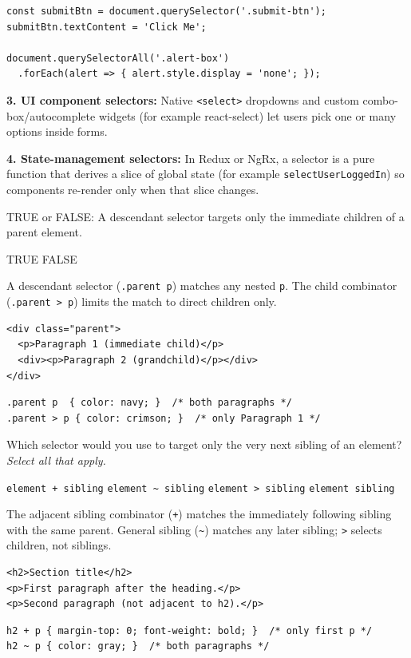 \begin{solutionorbox}[5in]
\begin{lstlisting}[style=js]
const submitBtn = document.querySelector('.submit-btn');
submitBtn.textContent = 'Click Me';

document.querySelectorAll('.alert-box')
  .forEach(alert => { alert.style.display = 'none'; });
\end{lstlisting}

\textbf{3. UI component selectors:} Native \lstinline[style=htmlinline]|<select>| dropdowns and custom combo-box/autocomplete widgets (for example react-select) let users pick one or many options inside forms.

\textbf{4. State-management selectors:} In Redux or NgRx, a selector is a pure function that derives a slice of global state (for example \lstinline[style=jsinline]|selectUserLoggedIn|) so components re-render only when that slice changes.
\end{solutionorbox}

\question[4]
TRUE or FALSE: A descendant selector targets only the immediate children of a parent element.
\begin{choices}
  \choice TRUE
  \CorrectChoice FALSE
\end{choices}
\begin{solution}
  A descendant selector (\texttt{.parent p}) matches any nested \texttt{p}. The child combinator (\texttt{.parent > p}) limits the match to direct children only.
\begin{lstlisting}[style=htmlinline]
<div class="parent">
  <p>Paragraph 1 (immediate child)</p>
  <div><p>Paragraph 2 (grandchild)</p></div>
</div>
\end{lstlisting}
\begin{lstlisting}[style=css]
.parent p  { color: navy; }  /* both paragraphs */
.parent > p { color: crimson; }  /* only Paragraph 1 */
\end{lstlisting}
\end{solution}

\question[4]
Which selector would you use to target only the very next sibling of an element? \emph{Select all that apply.}
\begin{checkboxes}
  \CorrectChoice \texttt{element + sibling}
  \choice \texttt{element \textasciitilde{} sibling}
  \choice \texttt{element > sibling}
  \choice \texttt{element sibling}
\end{checkboxes}
\begin{solution}
  The adjacent sibling combinator (\texttt{+}) matches the immediately following sibling with the same parent. General sibling (\texttt{{\textasciitilde}}) matches any later sibling; \texttt{>} selects children, not siblings.
\begin{lstlisting}[style=htmlinline]
<h2>Section title</h2>
<p>First paragraph after the heading.</p>
<p>Second paragraph (not adjacent to h2).</p>
\end{lstlisting}
\begin{lstlisting}[style=css]
h2 + p { margin-top: 0; font-weight: bold; }  /* only first p */
h2 ~ p { color: gray; }  /* both paragraphs */
\end{lstlisting}
\end{solution}

